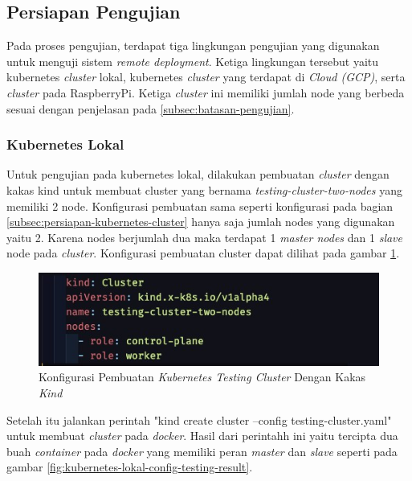 \subsection{Persiapan Pengujian}
Pada proses pengujian, terdapat tiga lingkungan pengujian yang digunakan untuk menguji sistem \textit{remote deployment}. Ketiga lingkungan tersebut yaitu kubernetes \textit{cluster} lokal, kubernetes \textit{cluster} yang terdapat di \textit{Cloud (GCP)}, serta \textit{cluster} pada RaspberryPi. Ketiga \textit{cluster} ini memiliki jumlah node yang berbeda sesuai dengan penjelasan pada \ref{subsec:batasan-pengujian}.

\subsubsection{Kubernetes Lokal}
Untuk pengujian pada kubernetes lokal, dilakukan pembuatan \textit{cluster} dengan kakas kind untuk membuat cluster yang bernama \textit{testing-cluster-two-nodes} yang memiliki 2 node. Konfigurasi pembuatan sama seperti konfigurasi pada bagian \ref{subsec:persiapan-kubernetes-cluster} hanya saja jumlah nodes yang digunakan yaitu 2.
Karena nodes berjumlah dua maka terdapat 1 \textit{master nodes} dan 1 \textit{slave} node pada \textit{cluster}. Konfigurasi pembuatan cluster dapat dilihat pada gambar \ref{fig:kubernetes-lokal-config-testing}.

\begin{figure}[htbp]
    \centering
    \includegraphics[width=1\textwidth]{resources/chapter-4/pengujian/kubernetes-lokal-config.jpg}
    \caption{Konfigurasi Pembuatan \textit{Kubernetes Testing Cluster} Dengan Kakas \textit{Kind}}
    \label{fig:kubernetes-lokal-config-testing}
\end{figure}

Setelah itu jalankan perintah "kind create cluster --config testing-cluster.yaml" untuk membuat \textit{cluster} pada \textit{docker}. Hasil dari perintahh ini yaitu tercipta dua buah \textit{container} pada \textit{docker} yang memiliki peran \textit{master} dan \textit{slave} seperti pada gambar \ref{fig:kubernetes-lokal-config-testing-result}.

